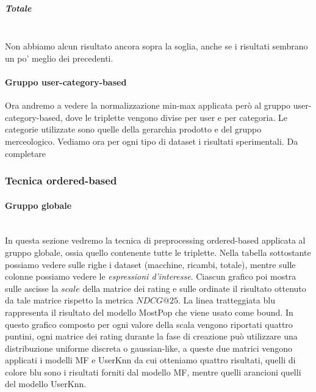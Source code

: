 \subparagraph{Totale}\mbox{} \\
Non abbiamo alcun risultato ancora sopra la soglia, anche se i risultati sembrano un po' meglio dei precedenti.

\paragraph{Gruppo user-category-based}
Ora andremo a vedere la normalizzazione min-max applicata però al gruppo user-category-based, dove le triplette vengono divise per user e per categoria.
Le categorie utilizzate sono quelle della gerarchia prodotto e del gruppo merceologico. Vediamo ora per ogni tipo di dataset i risultati sperimentali.
Da completare


\subsubsection{Tecnica ordered-based}

\paragraph{Gruppo globale}\mbox{} \\
In questa sezione vedremo la tecnica di preprocessing ordered-based applicata al gruppo globale, ossia quello contenente tutte le triplette.
Nella tabella sottostante possiamo vedere sulle righe i dataset (macchine, ricambi, totale), mentre sulle colonne possiamo vedere le \textit{espressioni d'interesse}. Ciascun grafico poi mostra sulle ascisse la $scale$ della matrice dei rating e sulle ordinate il risultato ottenuto da tale matrice rispetto la metrica $NDCG@25$. La linea tratteggiata blu rappresenta il risultato del modello MostPop che viene usato come bound.
In questo grafico composto per ogni valore della scala vengono riportati quattro puntini, ogni matrice dei rating durante la fase di creazione può utilizzare una distribuzione uniforme discreta o gaussian-like, a queste due matrici vengono applicati i modelli MF e UserKnn da cui otteniamo quattro risultati, quelli di colore blu sono i risultati forniti dal modello MF, mentre quelli arancioni quelli del modello UserKnn.

